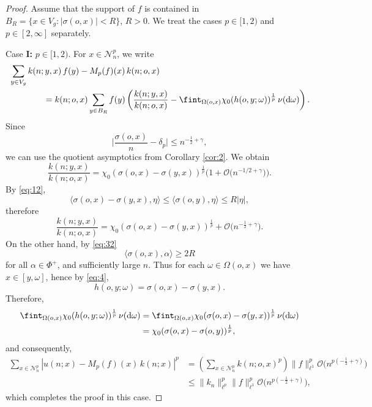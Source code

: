 \documentclass[11pt]{amsart}
\newcommand{\calO}{\mathcal{O}}
\newcommand{\scrN}{\mathscr{N}}
\newcommand{\abs}[1]{\lvert {#1} \rvert}
\newcommand{\sprod}[2]{\langle {#1}, {#2} \rangle}
\theoremstyle{plain}
\theoremstyle{definition}
\numberwithin{equation}{section}
\begin{document}
\begin{proof}
	Assume that the support of $f$ is contained in $B_R = \{x \in V_g: \abs{\sigma(o, x)} < R\}$, $R > 0$.
	We treat the cases $p \in [1, 2)$ and $p \in [2, \infty]$ separately.

	\vspace*{1ex}
	\noindent
	{Case {\bf I:} $p \in [1, 2)$.}
	For $x \in \scrN_n^p$, we write
	\begin{align*}
		&\sum_{y\in V_g} k(n; y, x) \,f(y)-M_p(f)(x)\, k(n; o, x) \\
		&\qquad\qquad
		=k(n;o,x) 
		\sum_{y\in B_R}
		f(y) \left( \frac{k (n;y,x)}{k(n;o,x)}-\fint_{\Omega(o,x)}\chi_0(h(o,y;\omega))^{\frac{1}{p}}\, 
		\nu({\rm d} \omega) \right).
	\end{align*}
	Since
	\begin{equation}
		\label{eq:32}
		\bigg|\frac{\sigma(o, x)}{n} - \delta_p\bigg| \leqslant n^{-\frac12+\gamma},
	\end{equation}
	we can use the quotient asymptotics from Corollary \ref{cor:2}. We obtain
	\[
		\frac{k(n;y,x)}{k(n;o,x)}
		=\chi_{0}(\sigma(o,x)-\sigma(y,x))^{\frac{1}{p}} \Big(1+\calO\big(n^{-1/2+\gamma}\big)\Big).
	\]
	By \eqref{eq:12},
	\[
		\sprod{\sigma(o,x)-\sigma(y,x)}{\eta} \leqslant \sprod{\sigma(o, y)}{\eta} \leqslant R|\eta|,
	\]
	therefore
	\[
		\frac{k(n;y,x)}{k(n;o,x)} = \chi_{0}(\sigma(o,x)-\sigma(y,x))^{\frac{1}{p}} + \calO\big(n^{-\frac12+\gamma}\big).
	\]
	On the other hand, by \eqref{eq:32}
	\[
		\sprod{\sigma(o, x)}{\alpha} \geq 2 R
	\]
	for all $\alpha \in \Phi^+$, and sufficiently large $n$. Thus for each $\omega \in \Omega(o, x)$  we have
	$x \in [y, \omega]$, hence by \eqref{eq:4},
	\[
		h(o,y; \omega)=\sigma(o,x)-\sigma(y, x).
	\]
	Therefore,
	\begin{align*}
		\fint_{\Omega(o,x)} \chi_0(h(o,y;\omega))^{\frac1p} \, \nu({\rm d}\omega)
		&=\fint_{\Omega(o,x)}\chi_{0}(\sigma(o, x)-\sigma(y, x))^{\frac1p} \, \nu({\rm d}\omega) \\
		&=\chi_{0}(\sigma(o,x)-\sigma(o,y))^{\frac1p},
	\end{align*}
 	and consequently,
	\begin{align*}
		\sum_{x \in \scrN_n^p}
		\left|
		u(n; x) 
		- M_p(f)(x)\, k(n;x)
		\right|^p
		&=
		\left(\sum_{x \in \scrN_n^p}
		k(n;o,x)^p\right) \|f\|_{\ell^1}^p \calO\Big(n^{p(-\frac12 + \gamma)}\Big) \\
		&\leqslant
		\|k_n\|_{\ell^p}^p \|f\|_{\ell^1}^p \calO\Big(n^{p(-\frac12 + \gamma)}\Big), 
	\end{align*}
	which completes the proof in this case.
	

\end{proof}
\end{document}
